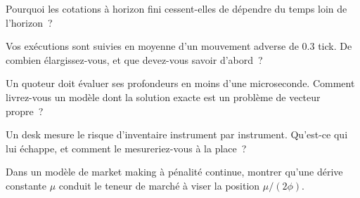 \begin{interviewq}\label{iq:hf:extensions-of-the-inventory-framework:2}
Pourquoi les cotations à horizon fini cessent-elles de dépendre du temps loin de l'horizon~?
\end{interviewq}

\begin{interviewq}\label{iq:hf:extensions-of-the-inventory-framework:3}
Vos exécutions sont suivies en moyenne d'un mouvement adverse de 0.3 tick. De combien élargissez-vous, et que devez-vous savoir d'abord~?
\end{interviewq}

\begin{interviewq}\label{iq:hf:extensions-of-the-inventory-framework:4}
Un quoteur doit évaluer ses profondeurs en moins d'une microseconde. Comment livrez-vous un modèle dont la solution exacte est un problème de vecteur propre~?
\end{interviewq}

\begin{interviewq}\label{iq:hf:extensions-of-the-inventory-framework:5}
Un desk mesure le risque d'inventaire instrument par instrument. Qu'est-ce qui lui échappe, et comment le mesureriez-vous à la place~?
\end{interviewq}

\begin{interviewq}\label{iq:hf:extensions-of-the-inventory-framework:6}
Dans un modèle de market making à pénalité continue, montrer qu'une dérive constante $\mu$ conduit le teneur de marché à viser la position $\mu/(2\phi)$.
\end{interviewq}
